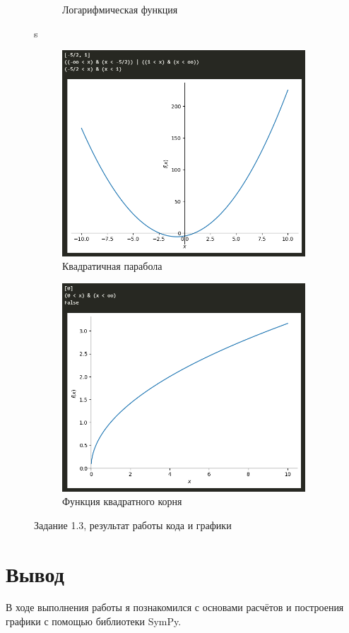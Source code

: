 \documentclass[14pt,a4paper]{extarticle}
\begin{document}
\begin{figure}[h!]
\begin{subfigure}{0.5\textwidth}
        \caption{Логарифмическая функция}
        \label{fig:1.3 ln}
    \end{subfigure}
s
    \begin{subfigure}{0.5\textwidth}
        \centering
        \includegraphics[width=0.9\linewidth]{figures//inftech//lab1/1.3 sq.png}
        \caption{Квадратичная парабола}
        \label{fig:1.3 sq}
    \end{subfigure}%
    \begin{subfigure}{0.5\textwidth}
        \centering
        \includegraphics[width=0.9\linewidth]{figures//inftech//lab1/1.3 sqrt.png}
        \caption{Функция квадратного корня}
        \label{fig:1.3 sqrt}
    \end{subfigure}
    \caption{Задание 1.3, результат работы кода и графики}
    \label{fig:1.3}
\end{figure}

\section*{Вывод}
В ходе выполнения работы я познакомился с основами расчётов и построения графики
с помощью библиотеки SymPy.
\end{document}
